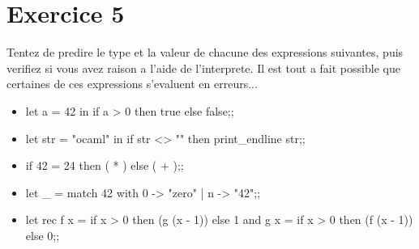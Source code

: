 \documentclass{life-fr}
\begin{document}
  \section{Exercice 5}

    Tentez de predire le type et la valeur de chacune des expressions suivantes,
  puis verifiez si vous avez raison a l'aide de l'interprete. Il est tout a fait
  possible que certaines de ces expressions s'evaluent en erreurs...

  \begin{itemize}
    \item let a = 42 in if a > 0 then true else false;;
    \item let str = "ocaml" in if str <> "" then print\_endline str;;
    \item if 42 = 24 then ( * ) else ( + );;
    \item let \_ = match 42 with 0 -> "zero" | n -> "42";;
    \item let rec f x = if x > 0 then (g (x - 1)) else 1 and g x = if x > 0 then
      (f (x - 1)) else 0;;
  \end{itemize}
\end{document}
